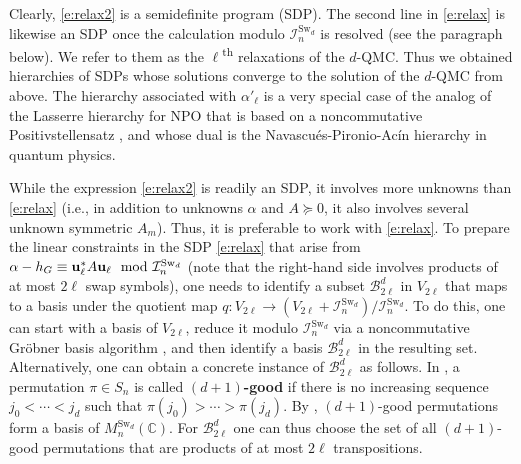 \documentclass[12pt,dvipsnames,accepted=2016-08-18,a4paper,onecolumn]{quantumarticle}
\numberwithin{equation}{section}
\newcommand{\CC}{\mathbb C}
\newcommand{\cB}{\mathcal B}
\theoremstyle{definition}
\begin{document}
Clearly, \eqref{e:relax2} is a semidefinite program (SDP). 
The second line in \eqref{e:relax} is likewise an SDP once the calculation modulo $\mathcal{I}^{\text{Sw}_d}_n$ is resolved (see the paragraph below). We refer to them as the $\ell$\textsuperscript{th} relaxations of the $d$-QMC. 
Thus we obtained hierarchies of SDPs whose solutions converge to the solution of the $d$-QMC from above. The hierarchy associated with $\alpha'_\ell$ is a very special case of the analog of the Lasserre hierarchy \cite{Las} for NPO that is based on a noncommutative Positivstellensatz \cite{HM}, and whose dual is the Navascu\'es-Pironio-Ac\'in hierarchy \cite{NPA08,NPA} in quantum physics.

While the expression \eqref{e:relax2} is readily an SDP, it involves more unknowns than \eqref{e:relax} (i.e., in addition to unknowns $\alpha$ and $A\succeq0$, it also involves several unknown symmetric $A_m$). Thus, it is preferable to work with \eqref{e:relax}. To prepare the linear constraints in the SDP \eqref{e:relax} that arise from $\alpha-h_G\equiv{\bf u}_\ell^*A{\bf u}_\ell \mod\mathcal{I}^{\text{Sw}_d}_n$ (note that the right-hand side involves products of at most $2\ell$ swap symbols), one needs to identify a subset $\cB^{d}_{2\ell}$ in $V_{2\ell}$ that maps to a basis under the quotient map $q:V_{2\ell}\to(V_{2\ell}+\mathcal{I}^{\text{Sw}_d}_n)/\mathcal{I}^{\text{Sw}_d}_n$. 
To do this, one can start with a basis of $V_{2\ell}$, reduce it modulo $\mathcal{I}^{\text{Sw}_d}_n$ via a noncommutative Gr\"obner basis algorithm \cite{Mor86}, and then identify a basis $\cB^{d}_{2\ell}$ in the resulting set.
Alternatively, one can obtain a concrete instance of $\cB^{d}_{2\ell}$ as follows.
In \cite{Pro21}, a permutation $\pi\in S_n$ is called {\bf $(d+1)$-good} if there is no increasing sequence $j_0<\cdots<j_d$ such that $\pi(j_0)>\cdots>\pi(j_d)$. By \cite[Theorem 8]{Pro21}, $(d+1)$-good permutations form a basis of $M^{\text{Sw}_d}_n(\CC)$. For $\cB^{d}_{2\ell}$ one can thus choose the set of all $(d+1)$-good permutations that are products of at most $2\ell$ transpositions.
\end{document}
